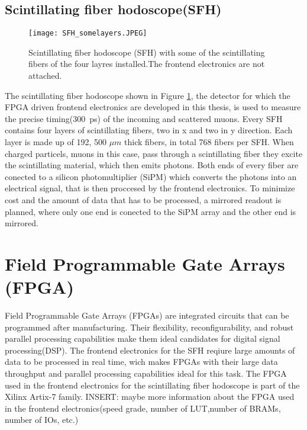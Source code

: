 \subsection{Scintillating fiber hodoscope(SFH)}
\begin{figure}[H]
	\centering
	\texttt{[image: SFH\_somelayers.JPEG]}
	\caption{Scintillating fiber hodoscope (SFH) with some of the scintillating fibers of the four layres installed.The frontend electronics are not attached.\autocite{InternalcommunicationKarl}}
	\label{SFHpicture}
\end{figure}
The scintillating fiber hodoscope shown in Figure \ref{SFHpicture}, 
the detector for which the FPGA driven frontend electronics are developed in this thesis,
is used to measure the precise timing(\SI{300}{\pico\second}\Autocite{Amber2022Status}) of the incoming and scattered muons. 
Every SFH contains four layers of scintillating fibers, two in x and two in y direction.
Each layer is made up of 192\autocite{Amber2022Status}, 500 $\mu m$ thick\autocite{Amber2024Status} fibers, in total 768\autocite{Amber2022Status} fibers per SFH. 
When charged particels, muons in this case, pass through a scintillating fiber they excite the scintillating material, 
which then emits photons. Both ends of every fiber are conected to a silicon photomultiplier (SiPM) which converts the photons into an electrical signal,
 that is then proccesed by the frontend electronics. To minimize cost and the amount of data that has to be processed, a mirrored readout is planned, 
 where only one end is conected to the SiPM array and the other end is mirrored.\autocite{InternalcommunicationKarl}

\section{Field Programmable Gate Arrays (FPGA)}\label{sec:FPGA}
Field Programmable Gate Arrays (FPGAs) are integrated circuits that can be programmed after manufacturing.
Their flexibility, reconfigurability, and robust parallel processing capabilities make them ideal candidates for digital signal processing(DSP).
The frontend electronics for the SFH reqiure large amounts of data to be processed in real time, wich makes FPGAs with their large data throughput and parallel processing capabilities ideal for this task.\autocite{FPGA_reviewDSP}
\newline
The FPGA used in the frontend electronics for the scintillating fiber hodoscope is part of the Xilinx Artix-7 family.\autocite{InternalcommunicationIgor}
INSERT: maybe more information about the FPGA used in the frontend electronics(speed grade, number of LUT,number of BRAMs, number of IOs, etc.)